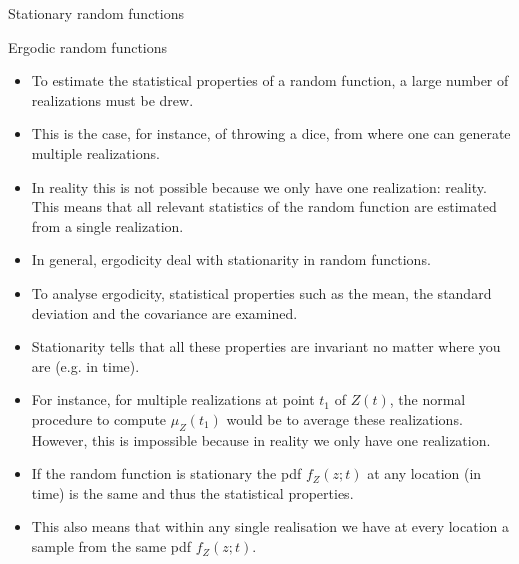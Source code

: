 \documentclass[8pt]{beamer}
\renewcommand{\emph}[1]{\textcolor{myorange}{#1}}
\begin{document}
\begin{frame}{Stationary random functions}
    \begin{block}{Ergodic random functions}
    \end{block}
    \begin{itemize}
        \item To estimate the statistical properties of a \emph{random function}, a large number of realizations must be drew. 
        \item This is the case, for instance, of throwing a dice, from where one can generate multiple realizations. 
        \item In reality this is not possible because we only have one realization: \emph{reality}. This means that all relevant statistics of the \emph{random function} are estimated from a single realization. 
        \item In general, \alert{ergodicity} deal with \emph{stationarity} in \emph{random functions}. 
        \item To analyse \emph{ergodicity}, statistical properties such as the \emph{mean}, the \emph{standard deviation} and the \emph{covariance} are examined.  
        \item \emph{Stationarity} tells that all these properties are invariant no matter where you are (e.g. in time). 
        \item For instance, for multiple realizations at point $t_1$ of $Z(t)$, the normal procedure to compute  $\mu_Z (t_1)$ would be to average these realizations. However, this is impossible because in reality we only have one realization.
        \item If the \emph{random function} is stationary the \emph{pdf} $f_Z (z; t)$ at any location (in time) is the same and thus the statistical properties. 
        \item This also means that within any single realisation we have at every location a sample from the same \emph{pdf} $f_Z (z;t)$. 
    \end{itemize}

\end{frame}
\end{document}
